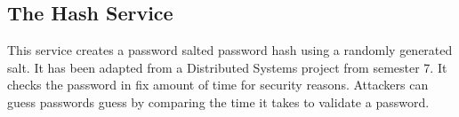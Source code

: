\subsection{The Hash Service}

\indent
\indent
This service creates a password salted password hash using a randomly generated salt. It has been adapted from a Distributed Systems project from semester 7.
It checks the password in fix amount of time for security reasons. Attackers can guess passwords guess by comparing the time it takes to validate a password.
\newpage
